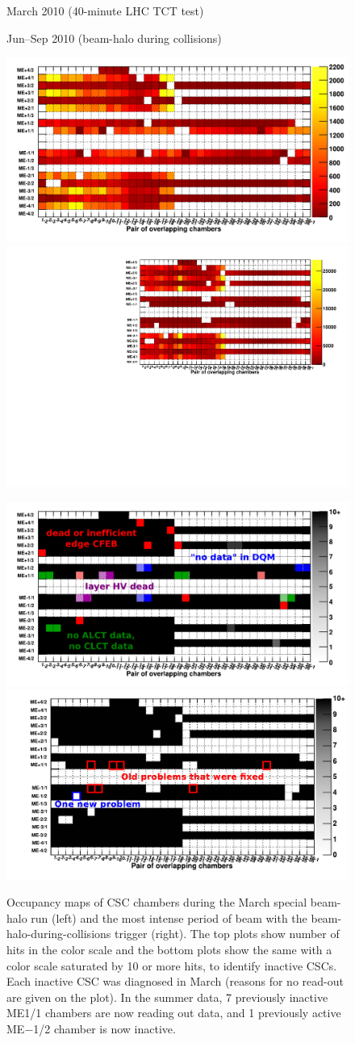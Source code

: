 \documentclass[12pt]{article}
\begin{document}
\begin{figure}
\begin{center}
\begin{minipage}{0.45\linewidth}
\begin{center}
March 2010 (40-minute LHC TCT test)
\end{center}
\end{minipage}
\begin{minipage}{0.45\linewidth}
\begin{center}
Jun--Sep 2010 (beam-halo during collisions)
\end{center}
\end{minipage}

\includegraphics[width=0.45\linewidth]{occupancy_March2010.pdf}
\includegraphics[width=0.45\linewidth]{occupancy_Oct2010.pdf}

\includegraphics[width=0.45\linewidth]{occupancy_problems_March2010.pdf}
\includegraphics[width=0.45\linewidth]{occupancy_problems_Oct2010.pdf}
\end{center}
\caption{Occupancy maps of CSC chambers during the March special
  beam-halo run (left) and the most intense period of beam with the
  beam-halo-during-collisions trigger (right).  The top plots show
  number of hits in the color scale and the bottom plots show the same
  with a color scale saturated by 10 or more hits, to identify
  inactive CSCs.  Each inactive CSC was diagnosed in March (reasons
  for no read-out are given on the plot).  In the summer data, 7
  previously inactive ME1/1 chambers are now reading out data, and 1
  previously active ME$-$1/2 chamber is now
  inactive. \label{fig:occupancy_March2010}}
\end{figure}
\end{document}
